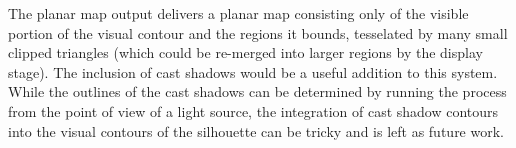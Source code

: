 \documentclass[review]{acmsiggraph}
\begin{document}
The planar map output delivers a planar map consisting only of the visible
portion of the visual contour and the regions it bounds, tesselated by many
small clipped triangles (which could be re-merged into larger regions by the
display stage). The inclusion of cast shadows would be a useful addition to
this system. While the outlines of the cast shadows can be determined by
running the process from the point of view of a light source, the integration
of cast shadow contours into the visual contours of the silhouette can be
tricky and is left as future work.



\end{document}
